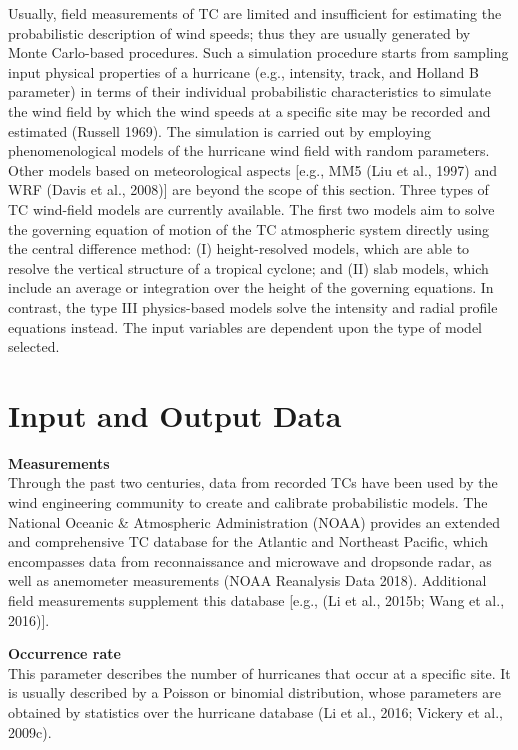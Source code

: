 Usually, field measurements of TC are limited and insufficient for estimating the probabilistic description of wind speeds; thus they are usually generated by Monte Carlo-based procedures. Such a simulation procedure starts from sampling input physical properties of a hurricane (e.g., intensity, track, and Holland B parameter) in terms of their individual probabilistic characteristics to simulate the wind field by which the wind speeds at a specific site may be recorded and estimated (Russell 1969). The simulation is carried out by employing phenomenological models of the hurricane wind field with random parameters. Other models based on meteorological aspects [e.g., MM5 (Liu et al., 1997) and WRF (Davis et al., 2008)] are beyond the scope of this section. Three types of TC wind-field models are currently available. The first two models aim to solve the governing equation of motion of the TC atmospheric system directly using the central difference method: (I) height-resolved models, which are able to resolve the vertical structure of a tropical cyclone; and (II) slab models, which include an average or integration over the height of the governing equations. In contrast, the type III physics-based models solve the intensity and radial profile equations instead. The input variables are dependent upon the type of model selected.

\section{Input and Output Data}
\label{sec:storm_wind_io}

\noindent\textbf{Measurements} \\Through the past two centuries, data from recorded TCs have been used by the wind engineering community to create and calibrate probabilistic models. The National Oceanic \& Atmospheric Administration (NOAA) provides an extended and comprehensive TC database for the Atlantic and Northeast Pacific, which encompasses data from reconnaissance and microwave and dropsonde radar, as well as anemometer measurements (NOAA Reanalysis Data 2018). Additional field measurements supplement this database [e.g., (Li et al., 2015b; Wang et al., 2016)].
\newline

\noindent\textbf{Occurrence rate} \\This parameter describes the number of hurricanes that occur at a specific site. It is usually described by a Poisson or binomial distribution, whose parameters are obtained by statistics over the hurricane database (Li et al., 2016; Vickery et al., 2009c).
\newline

